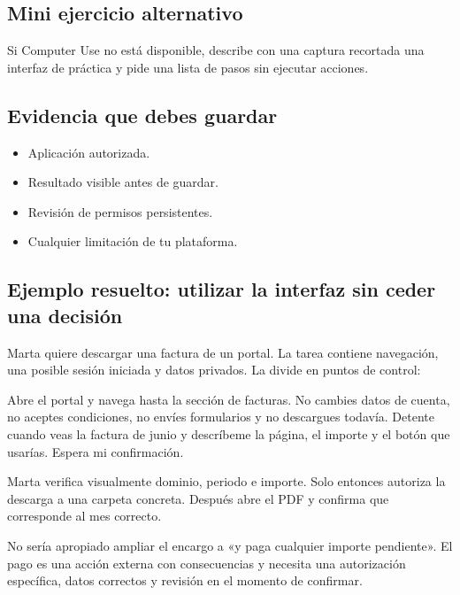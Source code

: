 \documentclass[10pt,a4paper,openany]{book}
\providecommand{\tightlist}{\setlength{\itemsep}{0.18em}\setlength{\parskip}{0pt}}
\newenvironment{Shaded}{}{}
\newcommand{\NormalTok}[1]{#1}
\renewenvironment{Shaded}
  {\begin{tcolorbox}[
    enhanced,
    breakable,
    colback=CodeBg,
    colframe=Border,
    boxrule=0.5pt,
    arc=2mm,
    left=3mm,
    right=3mm,
    top=2.2mm,
    bottom=2.2mm,
    before skip=0.8em,
    after skip=0.9em
  ]}
  {\end{tcolorbox}}
\begin{document}
\subsection{Mini ejercicio
alternativo}\label{mini-ejercicio-alternativo}

Si Computer Use no está disponible, describe con una captura recortada
una interfaz de práctica y pide una lista de pasos sin ejecutar
acciones.

\subsection{Evidencia que debes
guardar}\label{evidencia-que-debes-guardar-9}

\begin{itemize}
\tightlist
\item
  Aplicación autorizada.
\item
  Resultado visible antes de guardar.
\item
  Revisión de permisos persistentes.
\item
  Cualquier limitación de tu plataforma.
\end{itemize}

\subsection{Ejemplo resuelto: utilizar la interfaz sin ceder una
decisión}\label{ejemplo-resuelto-utilizar-la-interfaz-sin-ceder-una-decisiuxf3n}

Marta quiere descargar una factura de un portal. La tarea contiene
navegación, una posible sesión iniciada y datos privados. La divide en
puntos de control:

\begin{Shaded}
\begin{Highlighting}[]
\NormalTok{Abre el portal y navega hasta la sección de facturas.}
\NormalTok{No cambies datos de cuenta, no aceptes condiciones, no envíes formularios}
\NormalTok{y no descargues todavía. Detente cuando veas la factura de junio y descríbeme}
\NormalTok{la página, el importe y el botón que usarías. Espera mi confirmación.}
\end{Highlighting}
\end{Shaded}

Marta verifica visualmente dominio, periodo e importe. Solo entonces
autoriza la descarga a una carpeta concreta. Después abre el PDF y
confirma que corresponde al mes correcto.

No sería apropiado ampliar el encargo a «y paga cualquier importe
pendiente». El pago es una acción externa con consecuencias y necesita
una autorización específica, datos correctos y revisión en el momento de
confirmar.
\end{document}
